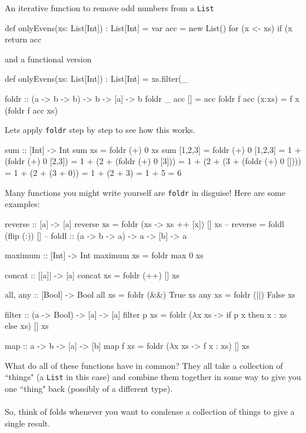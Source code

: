 \documentclass[12pt]{article}
\begin{document}
An iterative function to remove odd numbers from a \texttt{List}
\begin{scala}
def onlyEvens(xs: List[Int]) : List[Int] = {
    var acc = new List()
    for (x <- xs) {
        if (x %
    }
    return acc
}
\end{scala}

and a functional version
\begin{scala}
def onlyEvens(xs: List[Int]) : List[Int] = {
    xs.filter(_ %
}
\end{scala}

\newpage

\begin{haskell}
foldr :: (a -> b -> b) -> b -> [a] -> b
foldr _ acc []    = acc
foldr f acc (x:xs) = f x (foldr f acc xs)
\end{haskell}

Lets apply \texttt{foldr} step by step to see how this works.
\begin{haskell}
sum :: [Int] -> Int
sum xs = foldr (+) 0 xs
sum [1,2,3] = foldr (+) 0 [1,2,3]
            = 1 + (foldr (+) 0 [2,3])
            = 1 + (2 + (foldr (+) 0 [3]))
            = 1 + (2 + (3 + (foldr (+) 0 [])))
            = 1 + (2 + (3 + 0))
            = 1 + (2 + 3)
            = 1 + 5
            = 6
\end{haskell}

Many functions you might write yourself are \texttt{foldr} in disguise!
Here are some examples:
\begin{haskell}
reverse :: [a] -> [a]
reverse xs = foldr (\x xs -> xs ++ [x]) [] xs
-- reverse = foldl (flip (:)) []
-- foldl :: (a -> b -> a) -> a -> [b] -> a

maximum :: [Int] -> Int
maximum xs = foldr max 0 xs

concat :: [[a]] -> [a]
concat xs = foldr (++) [] xs

all, any :: [Bool] -> Bool
all xs = foldr (&&) True xs
any xs = foldr (||) False xs

filter :: (a -> Bool) -> [a] -> [a]
filter p xs = foldr ($\lambda$x xs -> if p x then x : xs else xs) [] xs

map :: a -> b -> [a] -> [b]
map f xs = foldr ($\lambda$x xs -> f x : xs) [] xs
\end{haskell}

What do all of these functions have in common?  They all take a collection of
``things" (a \texttt{List} in this case) and combine them together in some way
to give you one ``thing" back (possibly of a different type). \\ \\
So, think of folds whenever you want to condense a collection of things to give a
single result. \\
\end{document}
